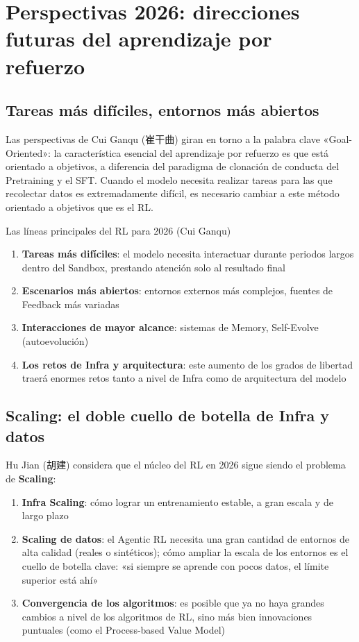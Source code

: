 \section{Perspectivas 2026: direcciones futuras del aprendizaje por refuerzo}

\subsection{Tareas más difíciles, entornos más abiertos}

Las perspectivas de Cui Ganqu (崔干曲) giran en torno a la palabra clave «Goal-Oriented»: la característica esencial del aprendizaje por refuerzo es que está orientado a objetivos, a diferencia del paradigma de clonación de conducta del Pretraining y el SFT. Cuando el modelo necesita realizar tareas para las que recolectar datos es extremadamente difícil, es necesario cambiar a este método orientado a objetivos que es el RL.

\begin{importantbox}{Las líneas principales del RL para 2026 (Cui Ganqu)}
\begin{enumerate}
    \item \textbf{Tareas más difíciles}: el modelo necesita interactuar durante periodos largos dentro del Sandbox, prestando atención solo al resultado final
    \item \textbf{Escenarios más abiertos}: entornos externos más complejos, fuentes de Feedback más variadas
    \item \textbf{Interacciones de mayor alcance}: sistemas de Memory, Self-Evolve (autoevolución)
    \item \textbf{Los retos de Infra y arquitectura}: este aumento de los grados de libertad traerá enormes retos tanto a nivel de Infra como de arquitectura del modelo
\end{enumerate}
\end{importantbox}

\subsection{Scaling: el doble cuello de botella de Infra y datos}

Hu Jian (胡建) considera que el núcleo del RL en 2026 sigue siendo el problema de \textbf{Scaling}:

\begin{enumerate}
    \item \textbf{Infra Scaling}: cómo lograr un entrenamiento estable, a gran escala y de largo plazo
    \item \textbf{Scaling de datos}: el Agentic RL necesita una gran cantidad de entornos de alta calidad (reales o sintéticos); cómo ampliar la escala de los entornos es el cuello de botella clave: «si siempre se aprende con pocos datos, el límite superior está ahí»
    \item \textbf{Convergencia de los algoritmos}: es posible que ya no haya grandes cambios a nivel de los algoritmos de RL, sino más bien innovaciones puntuales (como el Process-based Value Model)
\end{enumerate}

